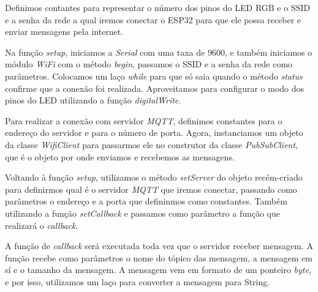 \documentclass[12pt]{article}
\begin{document}


Definimos contantes para representar o número dos pinos do LED RGB e o SSID e a senha da rede a qual iremos conectar o ESP32 para que ele possa receber e enviar mensagens pela internet.





Na função \textit{setup}, iniciamos a \textit{Serial} com uma taxa de 9600, e também iniciamos o módulo \textit{WiFi} com o método \textit{begin}, passamos o SSID e a senha da rede como parâmetros. Colocamos um laço \textit{while} para que só saia quando o método \textit{status} confirme que a conexão foi realizada. Aproveitamos para configurar o modo dos pinos do LED utilizando a função \textit{digitalWrite}.







Para realizar a conexão com servidor \textit{MQTT}, definimos constantes para o endereço do servidor e para o número de porta. Agora, instanciamos um objeto da classe \textit{WifiClient} para passarmos ele no construtor da classe \textit{PubSubClient}, que é o objeto por onde enviamos e recebemos as mensagens. 



Voltando à função \textit{setup}, utilizamos o método \textit{setServer} do objeto recém-criado para definirmos qual é o servidor \textit{MQTT} que iremos conectar, passando como parâmetros o endereço e a porta que defininmos como constantes. Também utilizando a função \textit{setCallback} e passamos como parâmetro a função que realizará o \textit{callback}.



A função de \textit{callback} será executada toda vez que o servidor receber mensagem. A função recebe como parâmetros o nome do tópico das mensagem, a mensagem em sí e o tamanho da mensagem. A mensagem vem em formato de um ponteiro \textit{byte}, e por isso, utilizamos um laço para converter a mensagem para String.
\end{document}

